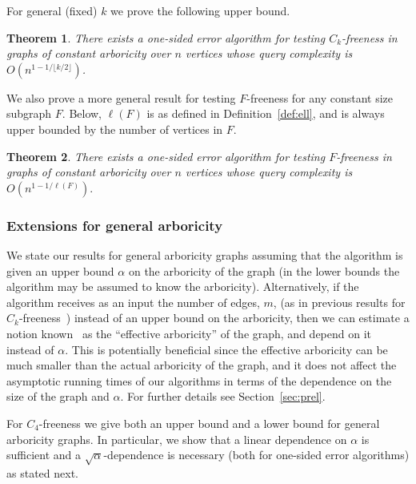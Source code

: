\documentclass{article}
\newtheorem{theorem}{Theorem}
\newcommand{\commentt}[1]{ {}}
\newcommand{\SodaReb}[1]{{ #1}}
\begin{document}
\smallskip
For general (fixed) $k$ we prove the following upper bound. 





\begin{theorem}\label{thm:Ck-ub-intro}
There exists a one-sided error algorithm for testing $C_k$-freeness in graphs of constant arboricity over $n$ vertices whose query complexity %
is $O(n^{1-1/\lfloor k/2 \rfloor })$. 
\end{theorem}

\SodaReb{
We also prove a more general result for testing $F$-freeness for any constant size subgraph $F$. Below, $\ell(F)$ is as defined in Definition~\ref{def:ell}, and is always upper bounded by the number of vertices in $F$.}

\begin{theorem}\label{thm:Gen-F-ub-intro}
\SodaReb{There exists  a one-sided error algorithm for testing  $F$-freeness in graphs of constant arboricity over $n$ vertices whose query complexity is $O(n^{1-1/\ell(F)}).$}
\end{theorem}


 \subsubsection{Extensions for general arboricity}


We state our results for general arboricity graphs assuming that the algorithm is given an 
upper bound $\alpha$ on the arboricity of the graph (in  the lower bounds the algorithm may be assumed to know the arboricity).
Alternatively,
if the algorithm receives as an input the number of edges, $m$, (as in previous results for $C_k$-freeness~\cite{AKKR08, Reut}) instead of an upper bound on the arboricity, then we can estimate a notion known~\cite{Reut} as the ``effective arboricity'' of the graph, and depend on it instead of $\alpha$. This is potentially beneficial since the effective arboricity can be much smaller than the actual arboricity of the graph, \SodaReb{and it does not affect the asymptotic running times of our algorithms in terms of the dependence on the size of the graph and $\alpha$}. For further details see Section~\ref{sec:prel}.

For $C_4$-freeness we give both an upper bound and a lower bound for general arboricity graphs. In particular, we show that a linear dependence on $\alpha$ is sufficient and a $\sqrt{\alpha}$-dependence is necessary (both for one-sided error algorithms) as stated next.
\end{document}
